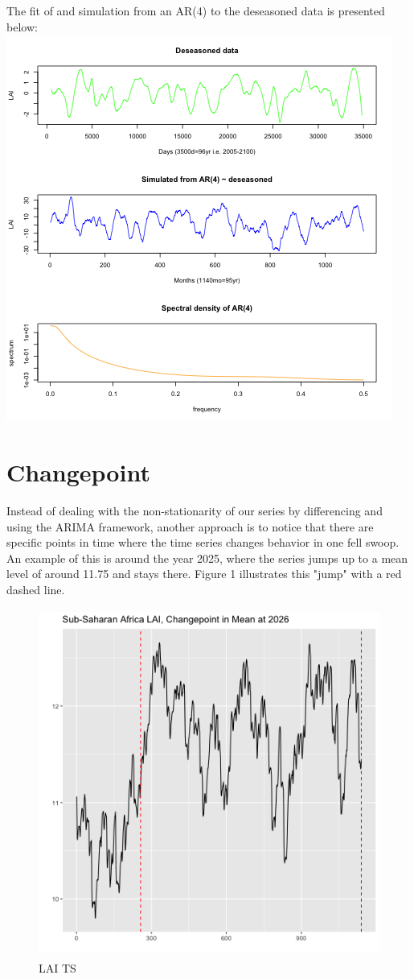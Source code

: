 \documentclass[11pt]{article}
\begin{document}
The fit of and simulation from an AR(4) to the deseasoned data is presented
below:
\includegraphics{../img/ar_sim.png}


\section{Changepoint}

Instead of dealing with the non-stationarity of our series by differencing and using the ARIMA framework, another approach is to notice that there are specific points in time where the time series changes behavior in one fell swoop. An example of this is around the year 2025, where the series jumps up to a mean level of around 11.75 and stays there. Figure 1 illustrates this "jump" with a red dashed line.
\begin{figure}[h]
	\centering
	\includegraphics[width=5in, height=4.5in]{../img/changepoint_LAI.png}
	\caption{LAI TS}
\end{figure}
\end{document}
